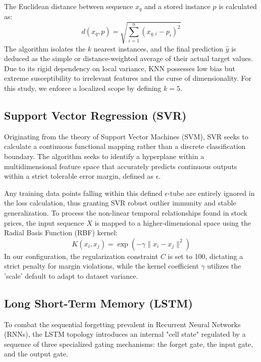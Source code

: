 \documentclass[12pt,onecolumn]{IEEEtran}
\begin{document}
The Euclidean distance between sequence $x_q$ and a stored instance $p$ is calculated as:
\begin{equation}
d(x_q, p) = \sqrt{\sum_{i=1}^{n} (x_{q,i} - p_i)^2}
\end{equation}
The algorithm isolates the $k$ nearest instances, and the final prediction $\hat{y}$ is deduced as the simple or distance-weighted average of their actual target values. Due to its rigid dependency on local variance, KNN possesses low bias but extreme susceptibility to irrelevant features and the curse of dimensionality. For this study, we enforce a localized scope by defining $k=5$.

\subsection{Support Vector Regression (SVR)}
Originating from the theory of Support Vector Machines (SVM), SVR seeks to calculate a continuous functional mapping rather than a discrete classification boundary. The algorithm seeks to identify a hyperplane within a multidimensional feature space that accurately predicts continuous outputs within a strict tolerable error margin, defined as $\epsilon$.

Any training data points falling within this defined $\epsilon$-tube are entirely ignored in the loss calculation, thus granting SVR robust outlier immunity and stable generalization. To process the non-linear temporal relationships found in stock prices, the input sequence $X$ is mapped to a higher-dimensional space using the Radial Basis Function (RBF) kernel:
\begin{equation}
K(x_i, x_j) = \exp\left(-\gamma \|x_i - x_j\|^2\right)
\end{equation}
In our configuration, the regularization constraint $C$ is set to 100, dictating a strict penalty for margin violations, while the kernel coefficient $\gamma$ utilizes the 'scale' default to adapt to dataset variance.

\subsection{Long Short-Term Memory (LSTM)}
To combat the sequential forgetting prevalent in Recurrent Neural Networks (RNNs), the LSTM topology introduces an internal "cell state" regulated by a sequence of three specialized gating mechanisms: the forget gate, the input gate, and the output gate.
\end{document}
